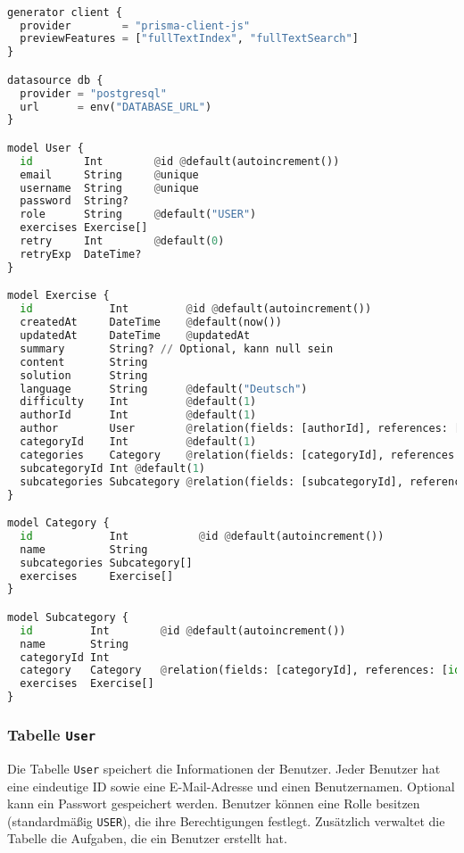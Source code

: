 \documentclass[12pt,a4paper]{scrartcl} %
\begin{document}
\begin{lstlisting}[language=Python]

generator client {
  provider        = "prisma-client-js"
  previewFeatures = ["fullTextIndex", "fullTextSearch"]
}

datasource db {
  provider = "postgresql"
  url      = env("DATABASE_URL")
}

model User {
  id        Int        @id @default(autoincrement())
  email     String     @unique
  username  String     @unique 
  password  String?
  role      String     @default("USER")
  exercises Exercise[]
  retry     Int        @default(0)
  retryExp  DateTime?  
}

model Exercise {
  id            Int         @id @default(autoincrement())
  createdAt     DateTime    @default(now())
  updatedAt     DateTime    @updatedAt
  summary       String? // Optional, kann null sein
  content       String
  solution      String
  language      String      @default("Deutsch")
  difficulty    Int         @default(1)
  authorId      Int         @default(1)
  author        User        @relation(fields: [authorId], references: [id])
  categoryId    Int         @default(1)
  categories    Category    @relation(fields: [categoryId], references: [id])
  subcategoryId Int @default(1)
  subcategories Subcategory @relation(fields: [subcategoryId], references: [id])
}

model Category {
  id            Int           @id @default(autoincrement())
  name          String
  subcategories Subcategory[]
  exercises     Exercise[]
}

model Subcategory {
  id         Int        @id @default(autoincrement())
  name       String
  categoryId Int
  category   Category   @relation(fields: [categoryId], references: [id], onDelete: Cascade)
  exercises  Exercise[]
}

\end{lstlisting}




\subsubsection{Tabelle \texttt{User}}

Die Tabelle \texttt{User} speichert die Informationen der Benutzer. Jeder Benutzer hat eine eindeutige ID sowie eine E-Mail-Adresse und einen Benutzernamen. Optional kann ein Passwort gespeichert werden. Benutzer können eine Rolle besitzen (standardmäßig \texttt{USER}), die ihre Berechtigungen festlegt. Zusätzlich verwaltet die Tabelle die Aufgaben, die ein Benutzer erstellt hat.
\end{document}
